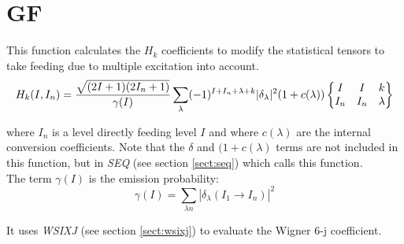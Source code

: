 \section{GF}
\label{sect:gf}

\noindent This function calculates the $H_k$ coefficients to modify the
statistical tensors to take feeding due to multiple excitation into
account.\\

\begin{equation}
H_k(I, I_n) =
{\sqrt{(2 I + 1) (2 I_n + 1)} \over \gamma(I)}
\sum_\lambda (-1)^{I + I_n + \lambda + k}
|\delta_\lambda|^2
(1 + c(\lambda))
\begin{Bmatrix}
I & I & k\\
I_n & I_n & \lambda
\end{Bmatrix}
\end{equation}

\noindent where $I_n$ is a level directly feeding level $I$ and where
$c(\lambda)$ are the internal conversion coefficients. Note that the
$\delta$ and $(1 + c(\lambda)$ terms are not included in this function, but
in {\em SEQ} (see section \ref{sect:seq}) which calls this function.\\

\noindent The term $\gamma(I)$ is the emission probability:\\

\begin{equation}
\gamma(I) =
\sum_{\lambda n} | \delta_\lambda(I_1 \rightarrow I_n)|^2
\end{equation}


\noindent It uses {\em WSIXJ} (see section \ref{sect:wsixj}) to evaluate
the Wigner 6-j coefficient.\\
